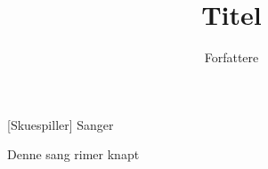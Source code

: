 \documentclass[a4paper,11pt]{article}
\title{Titel}
\author{Forfattere}
\begin{document}
\maketitle

\begin{roles}
[Skuespiller] Sanger
\end{roles}


\begin{song}
 Denne sang rimer knapt
\end{song}
\end{document}

